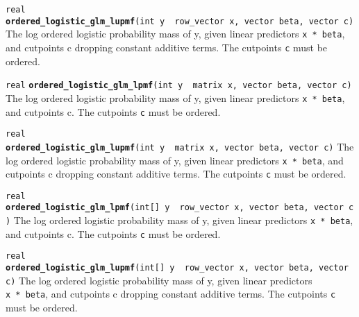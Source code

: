 \documentclass[
  10pt,
]{book}
\begin{document}

\texttt{real} \textbf{\texttt{ordered\_logistic\_glm\_lupmf}}\texttt{(int\ y\ \textbar{}\ row\_vector\ x,\ vector\ beta,\ vector\ c)}\newline
The log ordered logistic probability mass of y, given linear predictors
\texttt{x\ *\ beta}, and cutpoints c dropping constant additive terms. The cutpoints
\texttt{c} must be ordered.


\texttt{real} \textbf{\texttt{ordered\_logistic\_glm\_lpmf}}\texttt{(int\ y\ \textbar{}\ matrix\ x,\ vector\ beta,\ vector\ c)}\newline
The log ordered logistic probability mass of y, given linear predictors \texttt{x\ *\ beta}, and cutpoints c.
The cutpoints \texttt{c} must be ordered.


\texttt{real} \textbf{\texttt{ordered\_logistic\_glm\_lupmf}}\texttt{(int\ y\ \textbar{}\ matrix\ x,\ vector\ beta,\ vector\ c)}\newline
The log ordered logistic probability mass of y, given linear predictors
\texttt{x\ *\ beta}, and cutpoints c dropping constant additive terms. The cutpoints
\texttt{c} must be ordered.


\texttt{real} \textbf{\texttt{ordered\_logistic\_glm\_lpmf}}\texttt{(int{[}{]}\ y\ \textbar{}\ row\_vector\ x,\ vector\ beta,\ vector\ c)}\newline
The log ordered logistic probability mass of y, given linear predictors \texttt{x\ *\ beta}, and cutpoints c.
The cutpoints \texttt{c} must be ordered.


\texttt{real} \textbf{\texttt{ordered\_logistic\_glm\_lupmf}}\texttt{(int{[}{]}\ y\ \textbar{}\ row\_vector\ x,\ vector\ beta,\ vector\ c)}\newline
The log ordered logistic probability mass of y, given linear predictors
\texttt{x\ *\ beta}, and cutpoints c dropping constant additive terms. The cutpoints
\texttt{c} must be ordered.
\end{document}

